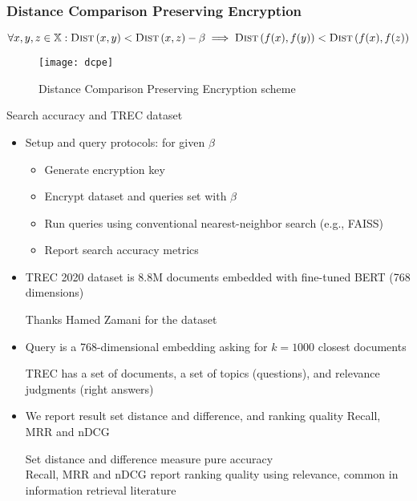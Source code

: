	\begin{frame}[label={frame:dcpe}]

		\frametitle{Distance Comparison Preserving Encryption}

		\[
			\forall x, y, z \in \mathbb{X} : \algo{Dist}{x, y} < \algo{Dist}{x, z} - \beta \implies \algo{Dist}{f(x), f(y)} < \algo{Dist}{f(x), f(z)}
		\]

		\begin{figure}[h]
			\centering
			\texttt{[image: dcpe]}
			\caption{
				Distance Comparison Preserving Encryption scheme \cite{dcpe} \\
				\hyperlink{frame:appendix:dcpe}{}
			}%
		\end{figure}

	\end{frame}

	\begin{frame}{Search accuracy and TREC dataset}

		\begin{itemize}
			\item<1->
				Setup and query protocols: for given $\beta$
				\begin{itemize}
					\item Generate encryption key
					\item Encrypt dataset and queries set with $\beta$
					\item Run queries using conventional nearest-neighbor search (e.g., FAISS)
					\item Report search accuracy metrics
				\end{itemize}

			\item<2->
				TREC 2020 dataset is 8.8M documents embedded with fine-tuned BERT (768 dimensions) \\
				\begin{small}
					\indent{} Thanks Hamed Zamani for the dataset
				\end{small}

			\item<3->
				Query is a 768-dimensional embedding asking for $k = \num{1000}$ closest documents \\
				\begin{small}
					\indent{} TREC has a set of documents, a set of topics (questions), and relevance judgments (right answers)
				\end{small}

			\item<4->
				We report result set distance and difference, and ranking quality Recall, MRR and nDCG \\
				\begin{small}
					\indent{} Set distance and difference measure pure \knn{} accuracy \\
					\indent{} Recall, MRR and nDCG report ranking quality using relevance, common in information retrieval literature
				\end{small}

		\end{itemize}

	\end{frame}

